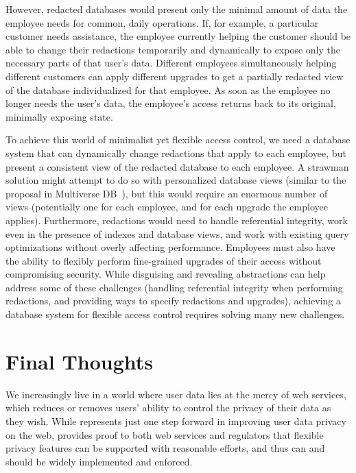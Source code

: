 %
However, redacted databases would present only the minimal amount of data the
employee needs for common, daily operations. If, for example, a particular
customer needs assistance, the employee currently helping the customer should be
able to change their redactions temporarily and dynamically to expose only the
necessary parts of that user's data.
%
Different employees simultaneously helping different customers can apply
different upgrades to get a partially redacted view of the database
individualized for that employee.
%
As soon as the employee no longer needs the user's data, the employee’s access
returns back to its original, minimally exposing state.

%
To achieve this world of minimalist yet flexible access control, we need a database
system that can dynamically change redactions that apply to each employee, but
present a consistent view of the redacted database to each employee. A strawman
solution might attempt to do so with personalized database views (similar to the
proposal in Multiverse DB~\cite{multiverse}), but this would require an enormous
number of views (potentially one for each employee, and for each upgrade the
employee applies).
%
Furthermore, redactions would need to handle referential integrity, work even in
the presence of indexes and database views, and work with existing query
optimizations without overly affecting performance.
%
Employees must also have the ability to flexibly perform fine-grained upgrades
of their access without compromising security.
%
While disguising and revealing abstractions can help address some of these
challenges (\eg handling referential integrity when performing redactions, and
providing ways to specify redactions and upgrades), achieving a database system
for flexible access control requires solving many new challenges.

\section{Final Thoughts}
We increasingly live in a world where user data lies at the mercy of web
services, which reduces or removes users' ability to control the privacy of their
data as they wish.
%
While \sys represents just one step forward in improving user data privacy on
the web, \sys provides proof to both web services and regulators that flexible
privacy features can be supported with reasonable efforts, and thus can
and should be widely implemented and enforced.
%
